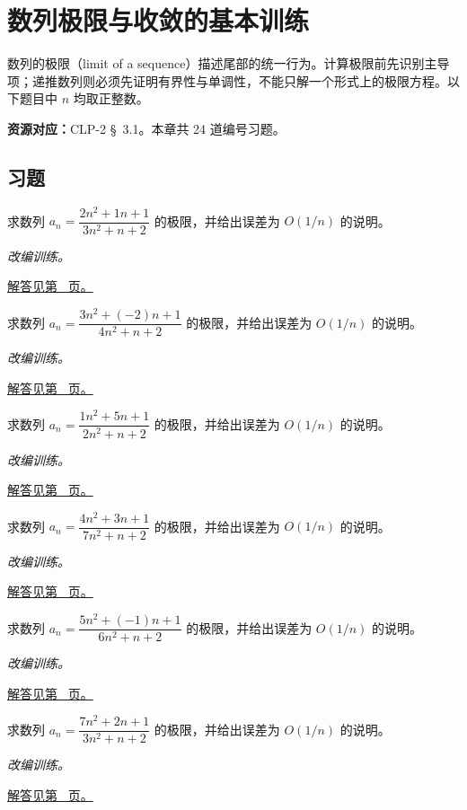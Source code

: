\documentclass[12pt,fontset=fandol]{ctexart}
\begin{document}
\section{数列极限与收敛的基本训练}\label{sec:ch1}
数列的极限（limit of a sequence）描述尾部的统一行为。计算极限前先识别主导项；递推数列则必须先证明有界性与单调性，不能只解一个形式上的极限方程。以下题目中 $n$ 均取正整数。

\textbf{资源对应：}CLP-2 \S~3.1。本章共 24 道编号习题。
\subsection{习题}
\begin{example}[同阶多项式的比]\label{ex:c1q1}
求数列 $a_n=\dfrac{2n^2+1n+1}{3n^2+n+2}$ 的极限，并给出误差为 $O(1/n)$ 的说明。
\par\textit{改编训练。}\par\hyperref[ans:c1q1]{解答见第~\pageref{ans:c1q1} 页。}
\end{example}
\begin{example}[同阶多项式的比]\label{ex:c1q2}
求数列 $a_n=\dfrac{3n^2+(-2)n+1}{4n^2+n+2}$ 的极限，并给出误差为 $O(1/n)$ 的说明。
\par\textit{改编训练。}\par\hyperref[ans:c1q2]{解答见第~\pageref{ans:c1q2} 页。}
\end{example}
\begin{example}[同阶多项式的比]\label{ex:c1q3}
求数列 $a_n=\dfrac{1n^2+5n+1}{2n^2+n+2}$ 的极限，并给出误差为 $O(1/n)$ 的说明。
\par\textit{改编训练。}\par\hyperref[ans:c1q3]{解答见第~\pageref{ans:c1q3} 页。}
\end{example}
\begin{example}[同阶多项式的比]\label{ex:c1q4}
求数列 $a_n=\dfrac{4n^2+3n+1}{7n^2+n+2}$ 的极限，并给出误差为 $O(1/n)$ 的说明。
\par\textit{改编训练。}\par\hyperref[ans:c1q4]{解答见第~\pageref{ans:c1q4} 页。}
\end{example}
\begin{example}[同阶多项式的比]\label{ex:c1q5}
求数列 $a_n=\dfrac{5n^2+(-1)n+1}{6n^2+n+2}$ 的极限，并给出误差为 $O(1/n)$ 的说明。
\par\textit{改编训练。}\par\hyperref[ans:c1q5]{解答见第~\pageref{ans:c1q5} 页。}
\end{example}
\begin{example}[同阶多项式的比]\label{ex:c1q6}
求数列 $a_n=\dfrac{7n^2+2n+1}{3n^2+n+2}$ 的极限，并给出误差为 $O(1/n)$ 的说明。
\par\textit{改编训练。}\par\hyperref[ans:c1q6]{解答见第~\pageref{ans:c1q6} 页。}
\end{example}
\end{document}
